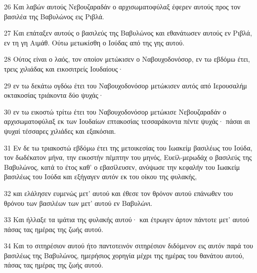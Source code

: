 \par 26 Και λαβών αυτούς Νεβουζαραδάν ο αρχισωματοφύλαξ έφερεν αυτούς προς τον βασιλέα της Βαβυλώνος εις Ριβλά.
\par 27 Και επάταξεν αυτούς ο βασιλεύς της Βαβυλώνος και εθανάτωσεν αυτούς εν Ριβλά, εν τη γη Αιμάθ. Ούτω μετωκίσθη ο Ιούδας από της γης αυτού.
\par 28 Ούτος είναι ο λαός, τον οποίον μετώκισεν ο Ναβουχοδονόσορ, εν τω εβδόμω έτει, τρεις χιλιάδας και εικοσιτρείς Ιουδαίους·
\par 29 εν τω δεκάτω ογδόω έτει του Ναβουχοδονόσορ μετώκισεν αυτός από Ιερουσαλήμ οκτακοσίας τριάκοντα δύο ψυχάς·
\par 30 εν τω εικοστώ τρίτω έτει του Ναβουχοδονόσορ μετώκισε Νεβουζαραδάν ο αρχισωματοφύλαξ εκ των Ιουδαίων επτακοσίας τεσσαράκοντα πέντε ψυχάς· πάσαι αι ψυχαί τέσσαρες χιλιάδες και εξακόσιαι.
\par 31 Εν δε τω τριακοστώ εβδόμω έτει της μετοικεσίας του Ιωακείμ βασιλέως του Ιούδα, τον δωδέκατον μήνα, την εικοστήν πέμπτην του μηνός, Ευείλ-μερωδάχ ο βασιλεύς της Βαβυλώνος, κατά το έτος καθ' ο εβασίλευσεν, ανύψωσε την κεφαλήν του Ιωακείμ βασιλέως του Ιούδα και εξήγαγεν αυτόν εκ του οίκου της φυλακής,
\par 32 και ελάλησεν ευμενώς μετ' αυτού και έθεσε τον θρόνον αυτού επάνωθεν του θρόνου των βασιλέων των μετ' αυτού εν Βαβυλώνι.
\par 33 Και ήλλαξε τα ιμάτια της φυλακής αυτού· και έτρωγεν άρτον πάντοτε μετ' αυτού πάσας τας ημέρας της ζωής αυτού.
\par 34 Και το σιτηρέσιον αυτού ήτο παντοτεινόν σιτηρέσιον διδόμενον εις αυτόν παρά του βασιλέως της Βαβυλώνος, ημερήσιος χορηγία μέχρι της ημέρας του θανάτου αυτού, πάσας τας ημέρας της ζωής αυτού.



